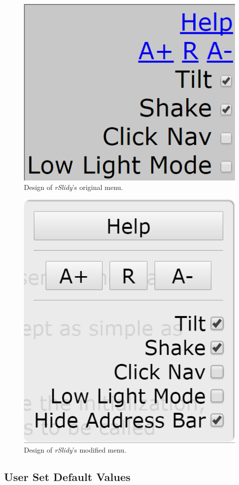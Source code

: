 \begin{figure}[tp]
	\centering
	\includegraphics[width = .4\textwidth]{images/menu_old.png}
	
	\caption[Original Menu]{
		Design of \textit{rSlidy}'s original menu.
	}
	\label{fig:menuOLD}
\end{figure}

\begin{figure}[tp]
	\centering
	\includegraphics[width = .4\textwidth]{images/menu_new.png}
	
	\caption[Modified Menu]{
		Design of \textit{rSlidy}'s modified menu.
	}
	\label{fig:menuNEW}
\end{figure}


\subsection{User Set Default Values} %
\label{sub:user_settings}

